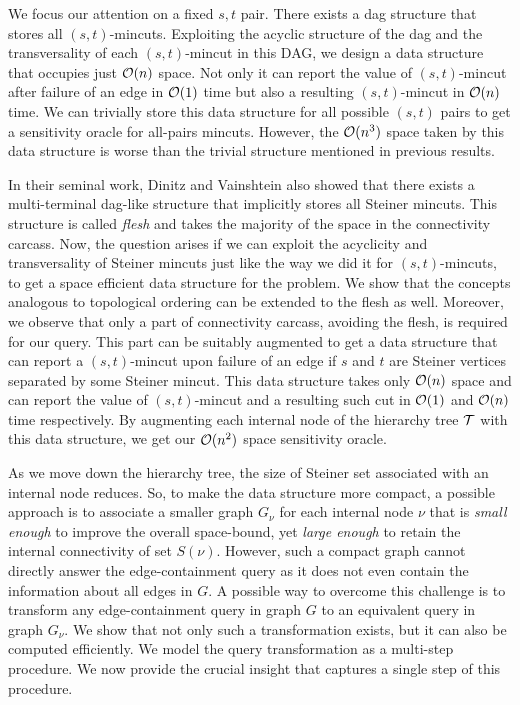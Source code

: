 We focus our attention on a fixed $s,t$ pair. There exists a dag structure \cite{DBLP:journals/mp/PicardQ82,DBLP:journals/siamcomp/DinitzV00} that stores all $(s,t)$-mincuts. Exploiting the acyclic structure of the dag and the transversality of each $(s,t)$-mincut in this DAG, we design a data structure that occupies just ${\cal O}(n)$ space. Not only it can report the value of $(s,t)$-mincut after failure of an edge in ${\cal O}(1)$ time but also a resulting $(s,t)$-mincut in ${\cal O}(n)$ time. We can trivially store this data structure for all possible $(s,t)$ pairs to get a sensitivity oracle for all-pairs mincuts. However, the ${\cal O}(n^3)$ space taken by this data structure is worse than the trivial structure mentioned in previous results.



In their seminal work, Dinitz and Vainshtein \cite{DBLP:conf/stoc/DinitzV94,DBLP:journals/siamcomp/DinitzV00} also showed that there exists a multi-terminal dag-like structure that implicitly stores all Steiner mincuts. This structure is called \textit{flesh} and takes the majority of the space in the connectivity carcass. Now, the question arises if we can exploit the acyclicity and transversality of Steiner mincuts just like the way we did it for $(s,t)$-mincuts, to get a space efficient data structure for the problem. We show that the concepts analogous to topological ordering can be extended to the flesh as well. Moreover, we observe that only a part of connectivity carcass, avoiding the flesh, is required for our query. This part can be suitably augmented to get a data structure that can report a $(s,t)$-mincut upon failure of an edge if $s$ and $t$ are Steiner vertices separated by some Steiner mincut. This data structure takes only ${\cal O}(n)$ space and can report the value of $(s,t)$-mincut and a resulting such cut in ${\cal O}(1)$ and ${\cal O}(n)$ time respectively. By augmenting each internal node of the hierarchy tree ${\cal T}$ with this data structure, we get our ${\cal O}(n^2)$ space sensitivity oracle.

As we move down the hierarchy tree, the size of Steiner set associated with an internal node reduces. So, to make the data structure more compact, a possible approach is to associate a smaller graph $G_\nu$ for each internal node $\nu$ that is {\em small enough} to improve the overall space-bound, yet {\em large enough} to retain the internal connectivity of set $S(\nu)$. 
However, such a compact graph cannot directly answer the edge-containment query as it does not even contain the information about all edges in $G$. A possible way to overcome this challenge is to transform any edge-containment query in graph $G$ to an equivalent query in graph $G_{\nu}$. We show that not only such a transformation exists, but it can also be computed efficiently. We model the query transformation as a multi-step procedure. 
We now provide the crucial insight that captures a single step of this procedure.

